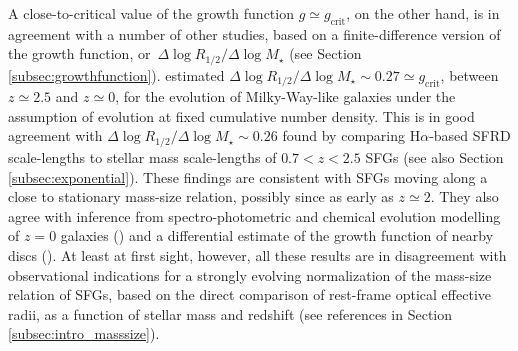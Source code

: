 \documentclass[fleqn,usenatbib]{mnras}
\begin{document}
A close-to-critical value of the growth function $g \simeq g_\textrm{crit}$, on the other hand, is in agreement with a number of other studies, based on a finite-difference version of the growth function, or\ $\Delta \log R_{1/2} / \Delta \log M_\star$ (see Section \ref{subsec:growthfunction}). \cite{vanDokkum+13} estimated  $\Delta \log R_{1/2} / \Delta \log M_\star \sim  0.27 \simeq g_\textrm{crit}$, between $z \simeq 2.5 $ and $z \simeq 0$, for the evolution of Milky-Way-like galaxies under the assumption of evolution at fixed cumulative number density. This is in good agreement with $\Delta \log R_{1/2} / \Delta \log M_\star \sim  0.26$ found by \cite{Wilman+20} comparing H$\alpha$-based SFRD scale-lengths to stellar mass scale-lengths of $0.7 < z < 2.5$ SFGs (see also Section \ref{subsec:exponential}). These findings are consistent with SFGs moving along a close to stationary mass-size relation, possibly since as early as $z \simeq 2$. They also agree with inference from spectro-photometric and chemical evolution modelling of $z=0$ galaxies (\citealt{MM11}) and a differential estimate of the growth function of nearby discs (\citealt{P+15}). At least at first sight, however, all these  results are in disagreement with observational indications for a strongly evolving normalization of the mass-size relation of SFGs, based on the direct comparison of rest-frame optical effective radii, as a function of stellar mass and redshift (see references in Section \ref{subsec:intro_masssize}).
\end{document}
